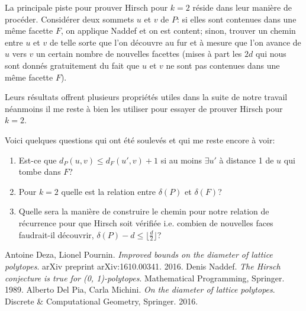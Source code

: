 \documentclass[11pt]{article}
\begin{document}
La principale piste pour prouver Hirsch pour $k=2$ réside dans leur manière de procéder. Considérer deux sommets $u$ et $v$ de $P$: si elles sont contenues dans une même facette $F$, on applique Naddef et on est content; sinon, trouver un chemin entre $u$ et $v$ de telle sorte que l'on découvre au fur et à mesure que l'on avance de $u$ vers $v$ un certain nombre de nouvelles facettes (mises à part les $2d$ qui nous sont donnés gratuitement du fait que $u$ et $v$ ne sont pas contenues dans une même facette $F$). 

Leurs résultats offrent plusieurs propriétés utiles dans la suite de notre travail néanmoins il me reste à bien les utiliser pour essayer de prouver Hirsch pour $k=2$.

Voici quelques questions qui ont été soulevés et qui me reste encore à voir:

\begin{enumerate}[i]
	\item Est-ce que $d_P(u,v)\leq{d_F(u',v)+1}$ si au moins $\exists{u'}$ à distance 1 de $u$ qui tombe dans $F$?
	\item Pour $k=2$ quelle est la relation entre $\delta(P)$ et $\delta(F)$?
	\item Quelle sera la manière de construire le chemin pour notre relation de récurrence pour que Hirsch soit vérifiée i.e. combien de nouvelles faces faudrait-il découvrir, $\delta(P)-d\leq{\lfloor{\frac{d}{2}}\rfloor}$?
\end{enumerate}



\clearpage

\begin{thebibliography}{9}
	Antoine Deza, Lionel Pournin.
	\emph{Improved bounds on the diameter of lattice polytopes}.
	arXiv preprint arXiv:1610.00341.
	2016.
	Denis Naddef.
	\emph{The Hirsch conjecture is true for (0, 1)-polytopes}.
	Mathematical Programming, Springer.
	1989.
	Alberto Del Pia, Carla Michini.
	\emph{On the diameter of lattice polytopes}.
	Discrete \& Computational Geometry, Springer.
	2016.
\end{thebibliography}
\end{document}
